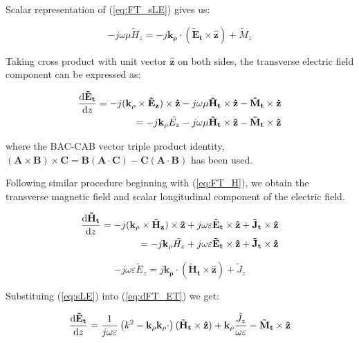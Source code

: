 \documentclass[11pt]{article}
\renewcommand{\v}[1]{\mathbf{#1}} %
\newcommand{\ti}[1]{\tilde{#1}} %
\renewcommand{\O}{\omega}  %
\renewcommand{\u}{\mu}  %
\newcommand{\x}{\times}  %
\begin{document}
  Scalar representation of (\ref{eq:FT_sLE}) gives us:

  \begin{equation}
    -j \O \u \ti{H}_z =
    -j \v{k_{\rho}} \cdot (\v{\ti{E}_t} \x \v{\hat{z}}) + {\ti{M}_z}
    \label{eq:sLH}
  \end{equation}

  Taking cross product with unit vector $\v{\hat{z}}$ on both sides, the transverse electric field component can be expressed as:

  \begin{equation}
    \begin{split}
      \dv{\v{\ti{E}_t}}{z} = -j (\v{k_{\rho}} \x \v{\ti{E}_z}) \x \v{\hat{z}}
      -j \O \u \v{\ti{H}_t} \x \v{\hat{z}}  -
      \v{\ti{M}_t} \x \v{\hat{z}} \\
      = -j \v{k_{\rho}} \ti{{E}_z} -j \O \u \v{\ti{H}_t} \x \v{\hat{z}}  -
      \v{\ti{M}_t} \x \v{\hat{z}}
    \end{split}
    \label{eq:dFT_ET}
  \end{equation}

  where the BAC-CAB vector triple product identity, $(\v{A} \x \v{B})\x\v{C} = \v{B}(\v{A} \cdot \v{C}) - \v{C}(\v{A} \cdot \v{B})$ has been used.

  Following similar procedure beginning with (\ref{eq:FT_H}), we obtain the transverse magnetic field and scalar longitudinal component of the electric field.

  \begin{equation}
    \begin{split}
      \dv{\v{\ti{H}_t}}{z} = -j (\v{k_{\rho}} \x \v{\ti{H}_z}) \x \v{\hat{z}}
      + j \O \varepsilon \v{\ti{E}_t} \x \v{\hat{z}} +
      \v{\ti{J}_t} \x \v{\hat{z}} \\
      = -j \v{k_{\rho}} \ti{{H}_z} + j \O \varepsilon \v{\ti{E}_t} \x \v{\hat{z}}  +
      \v{\ti{J}_t} \x \v{\hat{z}}
    \end{split}
    \label{eq:dFT_HT}
  \end{equation}

  \begin{equation}
    -j \O \varepsilon \ti{E}_z =
    j \v{k_{\rho}} \cdot (\v{\ti{H}_t} \x \v{\hat{z}}) + {\ti{J}_z}
    \label{eq:sLE}
  \end{equation}

  Substituing (\ref{eq:sLE}) into (\ref{eq:dFT_ET}) we get:

  \begin{equation}
    \dv{\v{\ti{E}_t}}{z} =
    \frac{1}{j \O \varepsilon} \left( k^2 - \v{k_{\rho}}\v{k_{\rho}} \cdot \right) (\v{\ti{H}_t} \x \v{\hat{z}}) + \v{k_{\rho}} \frac{\ti{J}_z}{\O \varepsilon} - \v{\ti{M}_t}
    \x \v{\hat{z}}
    \label{eq:Et}
  \end{equation}
\end{document}
